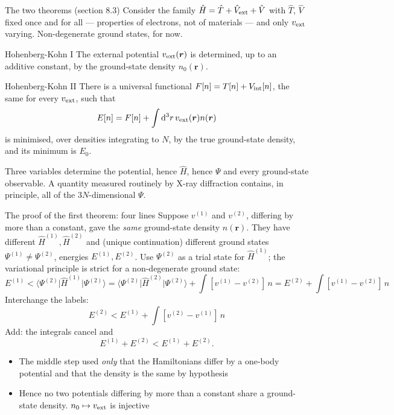 \documentclass[aspectratio=169,10pt]{beamer}
\newcommand{\element}[3]{\langle #1\vert #2\vert #3\rangle}
\newcommand{\dd}{\mathrm{d}}
\begin{document}
\begin{frame}{The two theorems (section 8.3)}
  \small
  Consider the family $\hat H=\hat T+\hat V_{\rm ext}+\hat V$ with $\hat T$, $\hat V$ fixed once and for all --- properties of electrons, not of materials --- and only $v_{\rm ext}$ varying. Non-degenerate ground states, for now.
  \begin{block}{Hohenberg-Kohn I}
    The external potential $v_{\rm ext}(\bm r)$ is determined, up to an additive constant, by the ground-state density $n_0(\bm r)$.
  \end{block}
  \begin{block}{Hohenberg-Kohn II}
    There is a universal functional $F[n]=T[n]+V_{\rm int}[n]$, the same for every $v_{\rm ext}$, such that
    \[
      E[n]=F[n]+\int\dd^3r\,v_{\rm ext}(\bm r)n(\bm r)
    \]
    is minimised, over densities integrating to $N$, by the true ground-state density, and its minimum is $E_0$.
  \end{block}
  \centering Three variables determine the potential, hence $\hat H$, hence $\Psi$ and every ground-state observable. A quantity measured routinely by X-ray diffraction contains, in principle, all of the $3N$-dimensional $\Psi$.
\end{frame}

\begin{frame}{The proof of the first theorem: four lines}
  Suppose $v^{(1)}$ and $v^{(2)}$, differing by more than a constant, gave the \emph{same} ground-state density $n(\bm r)$. They have different $\hat H^{(1)},\hat H^{(2)}$ and (unique continuation) different ground states $\Psi^{(1)}\ne\Psi^{(2)}$, energies $E^{(1)},E^{(2)}$.
  \vspace{0.3em}
  Use $\Psi^{(2)}$ as a trial state for $\hat H^{(1)}$; the variational principle is \alert{strict} for a non-degenerate ground state:
  \[
    E^{(1)}<\element{\Psi^{(2)}}{\hat H^{(1)}}{\Psi^{(2)}}=\element{\Psi^{(2)}}{\hat H^{(2)}}{\Psi^{(2)}}+\int[v^{(1)}-v^{(2)}]\,n=E^{(2)}+\int[v^{(1)}-v^{(2)}]\,n
  \]
  Interchange the labels:
  \[
    E^{(2)}<E^{(1)}+\int[v^{(2)}-v^{(1)}]\,n
  \]
  Add: the integrals cancel and
  \[
    E^{(1)}+E^{(2)}<E^{(1)}+E^{(2)}.
  \]
  \begin{itemize}
    \item The middle step used \emph{only} that the Hamiltonians differ by a one-body potential and that the density is the same by hypothesis
    \item Hence no two potentials differing by more than a constant share a ground-state density. $n_0\mapsto v_{\rm ext}$ is injective
  \end{itemize}
\end{frame}
\end{document}
